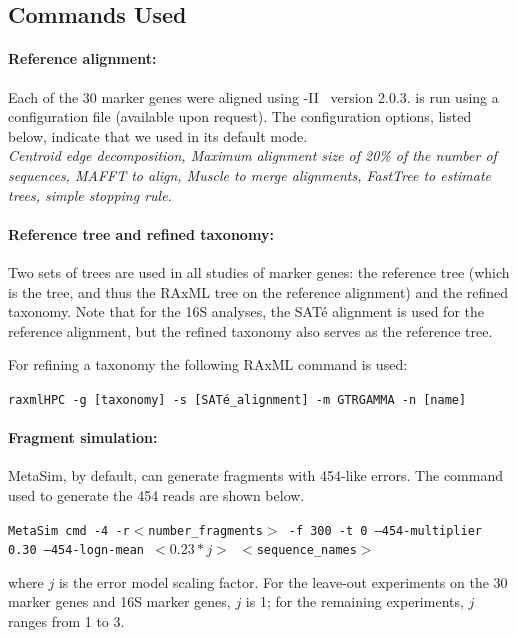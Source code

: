\subsection{Commands Used}\label{supp:commands}
\paragraph{Reference alignment: }

Each of the 30 marker genes were aligned using \sate-II~\cite{Liu2012} version 2.0.3. 
\sate is run using a configuration file (available upon request).
The configuration options, listed below, indicate
that we used \sate in its default mode. \\

\emph{Centroid edge decomposition, Maximum alignment size of 20\% of the number of sequences, MAFFT to align, Muscle to merge alignments, FastTree to estimate trees, simple stopping rule.}

\paragraph{Reference tree and refined taxonomy: }

Two sets of trees are used in all studies of marker genes:
the reference tree (which is the
\sate tree, and thus the RAxML tree
 on the reference alignment) and the refined
taxonomy.  
Note that for the 16S analyses, the SAT\'{e} alignment is
used for the reference
alignment, but the refined taxonomy also serves as the reference
tree.

For refining a taxonomy the following RAxML command is used:

{\tt raxmlHPC -g [taxonomy] -s [SAT\'{e}\_alignment] -m GTRGAMMA -n [name]}

\paragraph{Fragment simulation: }

MetaSim, by default, can generate fragments with 454-like errors.  The command used to generate the 454 reads are shown below.

{\tt MetaSim cmd -4 -r$<$number\_fragments$>$ -f 300 -t 0 --454-multiplier 0.30 --454-logn-mean $<0.23*j>$ $<$sequence\_names$>$}

where $j$ is the error model scaling factor.  For the leave-out experiments on the 30 marker genes and 16S marker genes, $j$ is 1; for the remaining experiments, $j$ ranges from 1 to 3.

